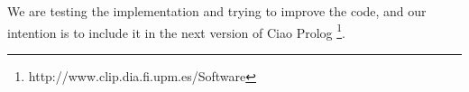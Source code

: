 \documentclass{tlp}
\begin{document}
We are testing the implementation and trying to improve the code, and
our intention is to include it in the next version of Ciao Prolog
\footnote{http://www.clip.dia.fi.upm.es/Software}.
  



\end{document}

